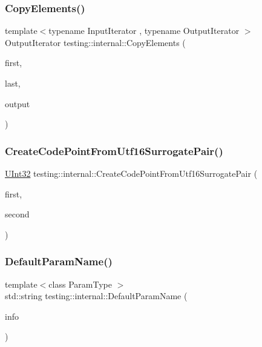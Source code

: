 \subsubsection{\texorpdfstring{CopyElements()}{CopyElements()}}
{\footnotesize\ttfamily template$<$typename Input\+Iterator , typename Output\+Iterator $>$ \\
Output\+Iterator testing\+::internal\+::\+Copy\+Elements (\begin{DoxyParamCaption}\item[{Input\+Iterator}]{first,  }\item[{Input\+Iterator}]{last,  }\item[{Output\+Iterator}]{output }\end{DoxyParamCaption})\hspace{0.3cm}{\ttfamily [inline]}}

\mbox{\label{namespacetesting_1_1internal_ac8ef1bb10cd9e69de939789b759e6bc9}} 
\subsubsection{\texorpdfstring{CreateCodePointFromUtf16SurrogatePair()}{CreateCodePointFromUtf16SurrogatePair()}}
{\footnotesize\ttfamily \mbox{\hyperlink{namespacetesting_1_1internal_a436defbb8e92c8e94e33ebcc86f278ba}{U\+Int32}} testing\+::internal\+::\+Create\+Code\+Point\+From\+Utf16\+Surrogate\+Pair (\begin{DoxyParamCaption}\item[{wchar\+\_\+t}]{first,  }\item[{wchar\+\_\+t}]{second }\end{DoxyParamCaption})\hspace{0.3cm}{\ttfamily [inline]}}

\mbox{\label{namespacetesting_1_1internal_a954ec4a8a932dac7743e77e459ffefdc}} 
\subsubsection{\texorpdfstring{DefaultParamName()}{DefaultParamName()}}
{\footnotesize\ttfamily template$<$class Param\+Type $>$ \\
std\+::string testing\+::internal\+::\+Default\+Param\+Name (\begin{DoxyParamCaption}\item[{const \mbox{\hyperlink{structtesting_1_1_test_param_info}{Test\+Param\+Info}}$<$ Param\+Type $>$ \&}]{info }\end{DoxyParamCaption})}

